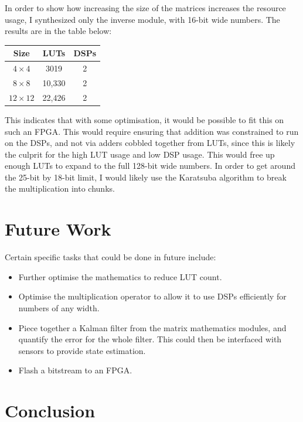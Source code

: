 \documentclass[12pt]{article}
\begin{document}
In order to show how increasing the size of the matrices increases the resource usage, I synthesized only the inverse module, with 16-bit wide numbers. The results are in the table below:

\begin{center}
	\begin{tabular}{ c | c c }
		Size & LUTs & DSPs \\ 
		\hline
		$4\times4$ & 3019 & 2 \\  
		$8\times8$ & 10,330 & 2 \\
		$12\times12$ & 22,426 & 2
	\end{tabular}
\end{center}

This indicates that with some optimisation, it would be possible to fit this on such an FPGA. This would require ensuring that addition was constrained to run on the DSPs, and not via adders cobbled together from LUTs, since this is likely the culprit for the high LUT usage and low DSP usage. This would free up enough LUTs to expand to the full 128-bit wide numbers. In order to get around the 25-bit by 18-bit limit, I would likely use the Karatsuba algorithm \cite{karatsuba} to break the multiplication into chunks.

\section{Future Work}

Certain specific tasks that could be done in future include:

\begin{itemize}
	\item Further optimise the mathematics to reduce LUT count.
	\item Optimise the multiplication operator to allow it to use DSPs efficiently for numbers of any width.
	\item Piece together a Kalman filter from the matrix mathematics modules, and quantify the error for the whole filter. This could then be interfaced with sensors to provide state estimation.
	\item Flash a bitstream to an FPGA.
\end{itemize}

\section{Conclusion}
\end{document}
